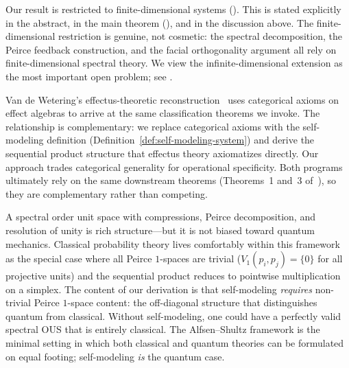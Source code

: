 \begin{remark}
\label{rem:infty-objection}
Our result is restricted to finite-dimensional systems
().  This is stated explicitly in the abstract, in
the main theorem (), and in the discussion above.  The
finite-dimensional restriction is genuine, not cosmetic: the spectral
decomposition, the Peirce feedback construction, and the facial
orthogonality argument all rely on finite-dimensional spectral theory.
We view the infinite-dimensional extension as the most important open
problem; see .
\end{remark}

\begin{remark}
\label{rem:effectus-objection}
Van de Wetering's effectus-theoretic
reconstruction~\cite{vandeWetering2019} uses categorical axioms on
effect algebras to arrive at the same classification theorems we
invoke.  The relationship is complementary: we replace categorical axioms
with the self-modeling definition
(Definition~\ref{def:self-modeling-system}) and derive the
sequential product structure that effectus theory axiomatizes
directly.  Our approach trades categorical generality for
operational specificity.
Both programs ultimately rely on the same downstream theorems
(Theorems~1 and~3 of~\cite{vandeWetering2019b}), so they are
complementary rather than competing.
\end{remark}

\begin{remark}
\label{rem:proximity-objection}
A spectral order unit space with compressions, Peirce decomposition,
and resolution of unity is rich structure---but it is not biased toward
quantum mechanics.  Classical probability theory lives comfortably
within this framework as the special case where all Peirce $1$-spaces
are trivial ($V_1(p_i, p_j) = \{0\}$ for all projective units) and
the sequential product reduces to pointwise multiplication on a
simplex.  The content of our derivation is that self-modeling \emph{requires}
non-trivial Peirce $1$-space content: the off-diagonal structure that
distinguishes quantum from classical.  Without self-modeling, one
could have a perfectly valid spectral OUS that is entirely classical.
The Alfsen--Shultz framework is the minimal setting in which both
classical and quantum theories can be formulated on equal footing;
self-modeling \emph{is} the quantum case.
\end{remark}


